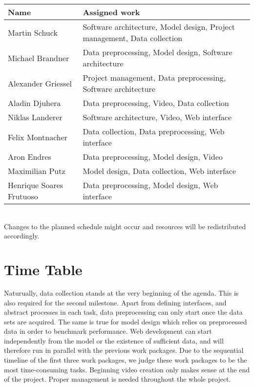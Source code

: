 \documentclass[s=english,inputenc=utf8,fontsize=10pt]{ldvarticle}
\begin{document}
\begin{center}
	\begin{footnotesize}
		\setlength{\arrayrulewidth}{1,05pt}
		\begin{tabular}[htb]{|p{3cm}|p{9.1cm}|}
			\hline
			\textbf{Name} & \textbf{Assigned work} \\
			\hline
			\hline
			\rowcolor{lightgray} Martin Schuck & Software architecture, Model design, Project management, Data collection \\
			\hline
			\rowcolor{lightgray} Michael Brandner & Data preprocessing, Model design, Software architecture \\
			\hline	
			\rowcolor{lightgray} Alexander Griessel & Project management, Data preprocessing, Software architecture \\
			\hline
			\rowcolor{lightgray} Aladin Djuhera & Data preprocessing, Video, Data collection \\
			\hline
			\rowcolor{lightgray} Niklas Landerer & Software architecture, Video, Web interface\\
			\hline
			\rowcolor{lightgray} Felix Montnacher & Data collection, Data preprocessing, Web interface\\
			\hline	
			\rowcolor{lightgray} Aron Endres & Data preprocessing, Model design, Video \\
			\hline
			\rowcolor{lightgray} Maximilian Putz & Model design, Data collection, Web interface \\
			\hline
			\rowcolor{lightgray} Henrique Soares Frutuoso & Data preprocessing, Model design, Web interface \\
			\hline
		\end{tabular}
	\end{footnotesize}
\end{center}
\leavevmode \\
Changes to the planned schedule might occur and resources will be redistributed accordingly.
\newpage

\section{Time Table}

Naturually, data collection stands at the very beginning of the agenda. This is also required for the second milestone. Apart from defining interfaces, and abstract processes in each task, data preprocessing can only start once the data sets are acquired. The same is true for model design which relies on preprocessed data in order to benchmark performance. Web development can start independently from the model or the existence of sufficient data, and will therefore run in parallel with the previous work packages. Due to the sequential timeline of the first three work packages, we judge these work packages to be the most time-consuming tasks. Beginning video creation only makes sense at the end of the project. Proper management is needed throughout the whole project.
\end{document}
